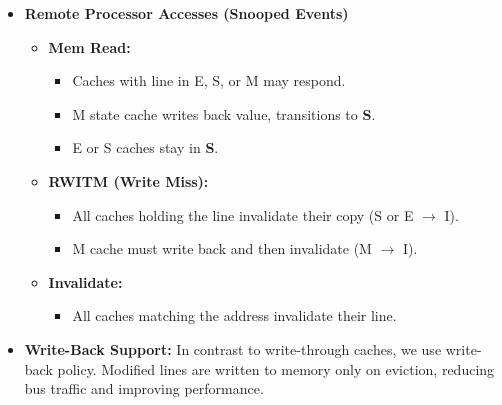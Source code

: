 \documentclass[11pt]{article}
\begin{document}
\begin{itemize}
\begin{itemize}
      \item \textbf{Write Miss:}
        \begin{itemize}
          \item Bus transaction issued as RWITM (Read With Intent To Modify).
          \item Depending on copies in other caches:
          \begin{itemize}
            \item \emph{No copies:} Data is read from memory, updated, and marked (100 cycles for memory access)\textbf{M}.
            \item \emph{Copies in S or E:} Invalidate broadcast forces others to \textbf{I}. Local line is updated and marked \textbf{M}.(100 cycles for memory access)
            \item \emph{Copy in M:} The owner (in M) delays RWITM, writes back to memory, and invalidates its line. Then the requester retries RWITM, updates its line, and sets it to \textbf{M}.(100 cyles for writing copy to memory and 100 cycles again for reading value from memory into local cache)
          \end{itemize}
        \end{itemize}
    \end{itemize}

  \item \textbf{Remote Processor Accesses (Snooped Events)}
    \begin{itemize}
      \item \textbf{Mem Read:}
        \begin{itemize}
          \item Caches with line in E, S, or M may respond.
          \item M state cache writes back value, transitions to \textbf{S}.
          \item E or S caches stay in \textbf{S}.
        \end{itemize}
      \item \textbf{RWITM (Write Miss):}
        \begin{itemize}
          \item All caches holding the line invalidate their copy (S or E $\rightarrow$ I).
          \item M cache must write back and then invalidate (M $\rightarrow$ I).
        \end{itemize}
      \item \textbf{Invalidate:}
        \begin{itemize}
          \item All caches matching the address invalidate their line.
        \end{itemize}
    \end{itemize}

  \item \textbf{Write-Back Support:} In contrast to write-through caches, we use write-back policy. Modified lines are written to memory only on eviction, reducing bus traffic and improving performance.

\end{itemize}
\end{document}
